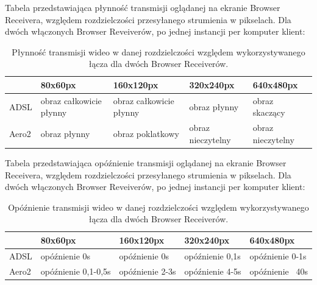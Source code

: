 Tabela przedstawiająca płynność transmisji oglądanej na ekranie Browser Receivera, względem rozdzielczości przesyłanego strumienia w pikselach. Dla dwóch włączonych Browser Reveiverów, po jednej instancji per komputer klient:
\begin{table}[h]
    \centering
    \begin{tabular}{|l|l|l|l|l|}
        \hline
        & 80x60px & 160x120px & 320x240px & 640x480px \\
        \hline
        ADSL
        &
        obraz całkowicie płynny 
        &
        obraz całkowicie płynny
        &
        obraz płynny
        &
        obraz skaczący
        \\
        \hline
        Aero2
        &
        obraz płynny
        &
        obraz poklatkowy
        &
        obraz nieczytelny
        &
        obraz nieczytelny
        \\
        \hline
    \end{tabular}
    \caption{Płynność transmisji wideo w danej rozdzielczości względem wykorzystywanego łącza dla dwóch Browser Receiverów.}
\end{table}

Tabela przedstawiająca opóźnienie transmisji oglądanej na ekranie Browser Receivera, względem rozdzielczości przesyłanego strumienia w pikselach. Dla dwóch włączonych Browser Reveiverów, po jednej instancji per komputer klient:
\begin{table}[h]
    \centering
    \begin{tabular}{|l|l|l|l|l|}
        \hline
        & 80x60px & 160x120px & 320x240px & 640x480px \\
        \hline
        ADSL
        &
        opóźnienie 0s
        &
        opóźnienie 0s
        &
        opóźnienie 0,1s
        &
        opóźnienie 0-1s \\
        \hline
        Aero2
        &
        opóźnienie 0,1-0,5s
        &
        opóźnienie 2-3s
        &
        opóźnienie 4-5s
        &
        opóźnienie ~40s \\
        \hline
    \end{tabular}
    \caption{Opóźnienie transmisji wideo w danej rozdzielczości względem wykorzystywanego łącza dla dwóch Browser Receiverów.}
\end{table}

